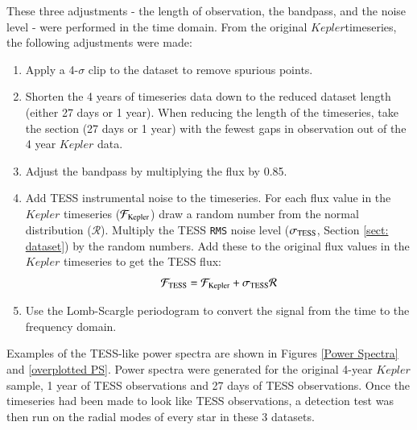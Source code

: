 \documentclass[a4paper,fleqn,usenatbib,useAMS]{mnras}
\newcommand{\kep}{\ensuremath{Kepler}\:}
\begin{document}
These three adjustments - the length of observation, the bandpass, and the noise level - were performed in the time domain. From the original \kep timeseries, the following adjustments were made:
\begin{enumerate}
\item Apply a 4-$\sigma$ clip to the dataset to remove spurious points.
\item Shorten the 4 years of timeseries data down to the reduced dataset length (either 27 days or 1 year). When reducing the length of the timeseries, take the section (27 days or 1 year) with the fewest gaps in observation out of the 4 year $Kepler$ data.%
\item Adjust the bandpass by multiplying the flux by 0.85.
\item Add TESS instrumental noise to the timeseries. For each flux value in the $Kepler$ timeseries ($\mathcal{F_{\rm Kepler}}$) draw a random number from the normal distribution ($\mathcal{R}$). Multiply the TESS \texttt{RMS} noise level ($\sigma_{\rm TESS}$, Section \ref{sect: dataset}) by the random numbers. Add these to the original flux values in the $Kepler$ timeseries to get the TESS flux:
\begin{equation}
\mathcal{F_{\rm TESS}} = \mathcal{F_{\rm Kepler}} + \sigma_{\rm TESS} \mathcal{R}
\end{equation}

\item Use the Lomb-Scargle periodogram to convert the signal from the time to the frequency domain.
\end{enumerate}

Examples of the TESS-like power spectra are shown in Figures \ref{Power Spectra} and \ref{overplotted PS}. Power spectra were generated for the original 4-year \kep sample, 1 year of TESS observations and 27 days of TESS observations. Once the timeseries had been made to look like TESS observations, a detection test was then run on the radial modes of every star in these 3 datasets. 
\end{document}
